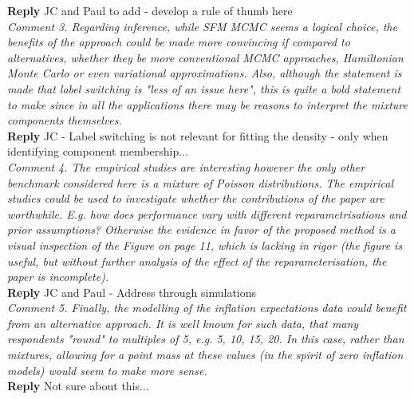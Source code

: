 \documentclass[12pt]{article}
\begin{document}
\textbf{Reply} JC and Paul to add - develop a rule of thumb here\\

\textit{Comment 3. Regarding inference, while SFM MCMC seems a logical choice, the benefits of the approach could be made more convincing if compared to alternatives, whether they be more conventional MCMC approaches, Hamiltonian Monte Carlo or even variational approximations. Also, although the statement is made that label switching is "less of an issue here", this is quite a bold statement to make since in all the applications there may be reasons to interpret the mixture components themselves.}\\

\textbf{Reply} JC - Label switching is not relevant for fitting the density - only when identifying component membership...\\

\textit{Comment 4. The empirical studies are interesting however the only other benchmark considered here is a mixture of Poisson distributions. The empirical studies could be used to investigate whether the contributions of the paper are worthwhile. E.g. how does performance vary with different reparametrisations and prior assumptions? Otherwise the evidence in favor of the proposed method is a visual inspection of the Figure on page 11, which is lacking in rigor (the figure is useful, but without further analysis of the effect of the reparameterisation, the paper is incomplete).}\\

\textbf{Reply} JC and Paul - Address through simulations\\

\textit{Comment 5. Finally, the modelling of the inflation expectations data could benefit from an alternative approach. It is well known for such data, that many respondents "round" to multiples of 5, e.g. 5, 10, 15, 20. In this case, rather than mixtures, allowing for a point mass at these values (in the spirit of zero inflation models) would seem to make more sense.}\\

\textbf{Reply} Not sure about this...\\


\noindent 




\end{document}
